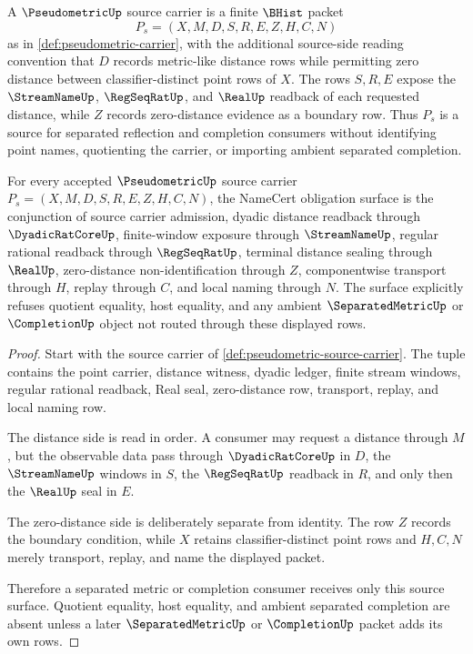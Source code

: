 \begin{definition}
\label{def:pseudometric-source-carrier}
A $\PseudometricUp$ source carrier is a finite $\BHist$ packet
$$
P_s=(X,M,D,S,R,E,Z,H,C,N)
$$
as in \autoref{def:pseudometric-carrier}, with the additional source-side reading convention that $D$ records metric-like distance rows while permitting zero distance between classifier-distinct point rows of $X$. The rows $S,R,E$ expose the $\StreamNameUp$, $\RegSeqRatUp$, and $\RealUp$ readback of each requested distance, while $Z$ records zero-distance evidence as a boundary row. Thus $P_s$ is a source for separated reflection and completion consumers without identifying point names, quotienting the carrier, or importing ambient separated completion.
\end{definition}

\begin{theorem}
\label{thm:pseudometric-namecert-obligation-surface}
For every accepted $\PseudometricUp$ source carrier $P_s=(X,M,D,S,R,E,Z,H,C,N)$, the NameCert obligation surface is the conjunction of source carrier admission, dyadic distance readback through $\DyadicRatCoreUp$, finite-window exposure through $\StreamNameUp$, regular rational readback through $\RegSeqRatUp$, terminal distance sealing through $\RealUp$, zero-distance non-identification through $Z$, componentwise transport through $H$, replay through $C$, and local naming through $N$. The surface explicitly refuses quotient equality, host equality, and any ambient $\SeparatedMetricUp$ or $\CompletionUp$ object not routed through these displayed rows.
\end{theorem}
\begin{proof}
Start with the source carrier of \autoref{def:pseudometric-source-carrier}. The tuple contains the point carrier, distance witness, dyadic ledger, finite stream windows, regular rational readback, Real seal, zero-distance row, transport, replay, and local naming row.

The distance side is read in order. A consumer may request a distance through $M$, but the observable data pass through $\DyadicRatCoreUp$ in $D$, the $\StreamNameUp$ windows in $S$, the $\RegSeqRatUp$ readback in $R$, and only then the $\RealUp$ seal in $E$.

The zero-distance side is deliberately separate from identity. The row $Z$ records the boundary condition, while $X$ retains classifier-distinct point rows and $H,C,N$ merely transport, replay, and name the displayed packet.

Therefore a separated metric or completion consumer receives only this source surface. Quotient equality, host equality, and ambient separated completion are absent unless a later $\SeparatedMetricUp$ or $\CompletionUp$ packet adds its own rows.
\end{proof}

